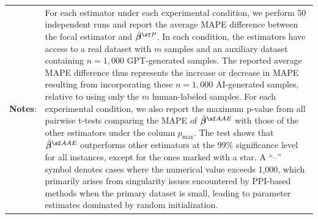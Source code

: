 \begin{table}[!ht]
{\begin{minipage}{15.5cm}
\begin{tabular}{p{1cm} p{14cm}}
         \textbf{Notes}: & \setlength{\baselineskip}{1.2\baselineskip} 
        For each estimator under each experimental condition, we perform 50 independent runs and report the average MAPE difference between the focal estimator and $\hat{\betavec}^{\sf P}$. In each condition, the estimators have access to a real dataset with $m$ samples and an auxiliary dataset containing $n = 1{,}000$ GPT-generated samples. The reported average MAPE difference thus represents the increase or decrease in MAPE resulting from incorporating these $n = 1{,}000$ AI-generated samples, relative to using only the $m$ human-labeled samples. For each experimental condition, we also report the maximum p-value from all pairwise t-tests comparing the MAPE of $\hat{\betavec}^{\sf AAE}$ with those of the other estimators under the column $p_{\max}$. The test shows that $\hat{\betavec}^{\sf AAE}$ outperforms other estimators at the 99\% significance level for all instances, except for the ones marked with a star. A “–” symbol denotes cases where the numerical value exceeds 1{,}000, which primarily arises from singularity issues encountered by PPI-based methods when the primary dataset is small, leading to parameter estimates dominated by random initialization.    
    \end{tabular}
  \end{minipage}}
\end{table}


